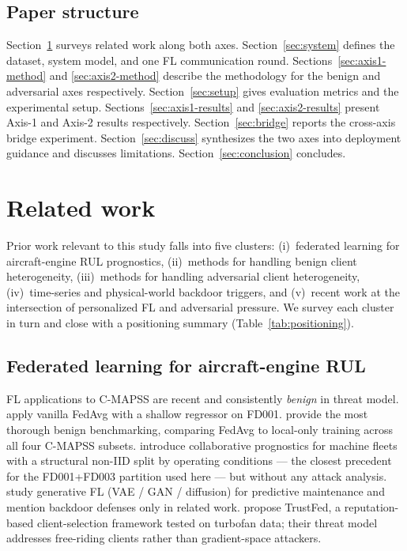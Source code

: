 \documentclass[preprint,12pt,authoryear]{elsarticle}
\begin{document}
\subsection{Paper structure}
\label{subsec:paper-structure}

Section~\ref{sec:related} surveys related work along both axes.
Section~\ref{sec:system} defines the dataset, system model, and one
FL communication round. Sections~\ref{sec:axis1-method} and
\ref{sec:axis2-method} describe the methodology for the benign and
adversarial axes respectively. Section~\ref{sec:setup} gives
evaluation metrics and the experimental setup.
Sections~\ref{sec:axis1-results} and \ref{sec:axis2-results} present
Axis-1 and Axis-2 results respectively. Section~\ref{sec:bridge}
reports the cross-axis bridge experiment. Section~\ref{sec:discuss}
synthesizes the two axes into deployment guidance and discusses
limitations. Section~\ref{sec:conclusion} concludes.


\section{Related work}
\label{sec:related}

Prior work relevant to this study falls into five clusters:
(i)~federated learning for aircraft-engine RUL prognostics,
(ii)~methods for handling benign client heterogeneity,
(iii)~methods for handling adversarial client heterogeneity,
(iv)~time-series and physical-world backdoor triggers, and
(v)~recent work at the intersection of personalized FL and
adversarial pressure. We survey each cluster in turn and close
with a positioning summary (Table~\ref{tab:positioning}).

\subsection{Federated learning for aircraft-engine RUL}
\label{subsec:related-fl-rul}

FL applications to C-MAPSS are recent and consistently
\emph{benign} in threat model.
\citet{Barbosa2025FLJetEngines} apply vanilla FedAvg with a shallow
regressor on FD001. \citet{Vermelin2024CollabFLRUL} provide the
most thorough benign benchmarking, comparing FedAvg to local-only
training across all four C-MAPSS subsets.
\citet{Pandhare2021FederatedBaseline} introduce collaborative
prognostics for machine fleets with a structural non-IID split
by operating conditions --- the closest precedent for the
FD001+FD003 partition used here --- but without any attack
analysis. \citet{Milasheuski2026GenerativeFL} study generative
FL (VAE / GAN / diffusion) for predictive maintenance and mention
backdoor defenses only in related work. \citet{Rehman2021TrustFed}
propose TrustFed, a reputation-based client-selection framework
tested on turbofan data; their threat model addresses free-riding
clients rather than gradient-space attackers.
\end{document}
